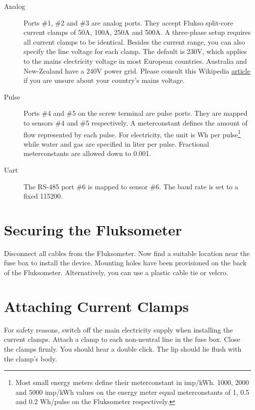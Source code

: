 \begin{description}

\item[Analog] Ports \#1, \#2 and \#3 are analog ports. They accept Flukso split-core current clamps of 50A, 100A, 250A and 500A. A three-phase setup requires all current clamps to be identical. Besides the current range, you can also specify the line voltage for each clamp. The default is 230V, which applies to the mains electricity voltage in most European countries. Australia and New-Zealand have a 240V power grid. Please consult this Wikipedia \href{http://en.wikipedia.org/wiki/Mains_electricity_by_country}{article} if you are unsure about your country's mains voltage.

\item[Pulse] Ports \#4 and \#5 on the screw terminal are pulse ports. They are mapped to sensors \#4 and \#5 respectively. A meterconstant defines the amount of flow represented by each pulse. For electricity, the unit is Wh per pulse\footnote{Most small energy meters define their meterconstant in imp/kWh. 1000, 2000 and 5000 imp/kWh values on the energy meter equal meterconstants of 1, 0.5 and 0.2 Wh/pulse on the Fluksometer respectively.} while water and gas are specified in liter per pulse. Fractional meterconstants are allowed down to 0.001.

\item[Uart] The RS-485 port \#6 is mapped to sensor \#6. The baud rate is set to a fixed 115200.

\end{description}

\section{Securing the Fluksometer}

Disconnect all cables from the Fluksometer. Now find a suitable location near the fuse box to install the device. Mounting holes have been provisioned on the back of the Fluksometer. Alternatively, you can use a plastic cable tie or velcro.

\section{Attaching Current Clamps}

For safety reasons, switch off the main electricity supply when installing the current clamps. Attach a clamp to each non-neutral line in the fuse box. Close the clamps firmly. You should hear a double click. The lip should lie flush with the clamp's body.

